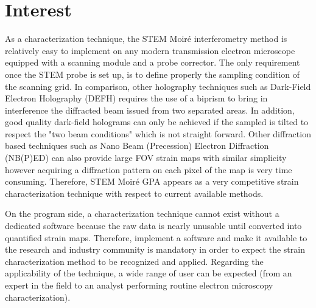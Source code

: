\documentclass{article}
\begin{document}
\section{Interest}
As a characterization technique, the STEM Moir{\'e} interferometry method is
relatively easy to implement on any modern transmission electron microscope
equipped with a scanning module and a probe corrector. The only requirement once
the STEM probe is set up, is to define properly the sampling condition of the
scanning grid. In comparison, other holography techniques such as Dark-Field
Electron Holography (DEFH) \cite{Hytch2008} requires the use of a biprism to
bring in interference the diffracted beam issued from two separated areas. In
addition, good quality dark-field holograms can only be achieved if the sampled
is tilted to respect the "two beam conditions"  which is not straight forward. Other
diffraction based techniques such as Nano Beam (Precession) Electron Diffraction
(NB(P)ED) \cite{Rouviere2013} can also provide large FOV strain maps with
similar simplicity however acquiring a diffraction pattern on each pixel of the
map is very time consuming. Therefore, STEM Moir{\'e} GPA appears as a very
competitive strain characterization technique with respect to current available
methods.\par \medskip On the program side, a characterization technique cannot
exist without a dedicated software because the raw data is nearly unusable until
converted into quantified strain maps. Therefore, implement a software and make
it available to the research and industry community is mandatory in order
 to
expect the strain characterization method to be recognized and
applied. Regarding the applicability of the technique, a wide range of user can
be expected (from an expert in the field to an analyst performing routine
electron microscopy characterization).




\end{document}
